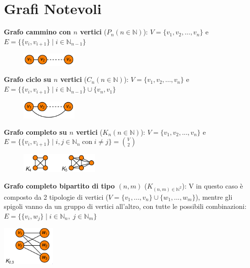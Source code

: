 \section{Grafi Notevoli}
\begin{flushleft}

    \textbf{Grafo cammino con $n$ vertici} ($P_n (n \in \mathbb{N})$): $V = \{v_1, v_2, ..., v_n\}$ e $E = \{\{v_i, v_{i+1}\} \; | \; i \in \mathbb{N}_{n-1}\}$

    \begin{figure}[h]
        \centering
        \includegraphics[width=0.25\textwidth]{img/grafo_cammino}
    \end{figure}

    \textbf{Grafo ciclo su $n$ vertici} ($C_n (n \in \mathbb{N})$): $V = \{v_1, v_2, ..., v_n\}$ e $E = \{\{v_i, v_{i+1}\} \; | \; i \in \mathbb{N}_{n-1}\} \cup \{v_n, v_1\}$
    
    \begin{figure}[h]
        \centering
        \includegraphics[width=0.25\textwidth]{img/grafo_ciclo}
    \end{figure}

    \textbf{Grafo completo su $n$ vertici} ($K_n (n \in \mathbb{N})$): $V = \{v_1, v_2, ..., v_n\}$ e $E = \{\{v_i, v_{i+1}\} \; | \; i, j \in \mathbb{N}_n \; \text{con} \; i \neq j\} = \binom{V}{2}$

    \begin{figure}[h]
        \centering
        \includegraphics[width=0.35\textwidth]{img/grafo_completo}
    \end{figure}

    \textbf{Grafo completo bipartito di tipo $(n, m)$} ($K_{(n, m) \in \mathbb{N}^2}$): V in questo caso è composto da 2 tipologie di vertici ($V = \{v_1, ..., v_n\} \cup \{w_1, ..., w_m\}$), mentre gli spigoli vanno da un gruppo di vertici all'altro, con tutte le possibili combinazioni: $E = \{\{v_i, w_j\} \; | \; i \in \mathbb{N}_n, \; j \in \mathbb{N}_m\}$

    \begin{center}
        \includegraphics[width=0.2\textwidth]{img/grafo_com_bip}
    \end{center}
\end{flushleft}

